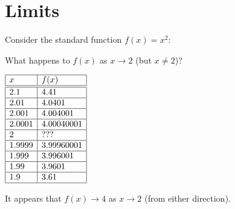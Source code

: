 \documentclass[letterpaper,12pt,fleqn]{article}
\begin{document}
\section*{Limits}

\begin{example}

  Consider the standard function \(f(x)=x^2\):

  \bigskip

  \begin{center}
  \end{center}

  \bigskip

  What happens to \(f(x)\) as \(x\to2\) (but \(x\ne 2\))?

  \bigskip

  \begin{center}
    \(\begin{array}{|l|l|}
    \hline
    x & f(x) \\
    \hline
    \hline
    2.1 & 4.41 \\
    \hline
    2.01 & 4.0401 \\
    \hline
    2.001 & 4.004001 \\
    \hline
    2.0001 & 4.00040001 \\
    \hline
    2 & ??? \\
    \hline
    1.9999 & 3.99960001 \\
    \hline
    1.999 & 3.996001 \\
    \hline
    1.99 & 3.9601 \\
    \hline
    1.9 & 3.61 \\
    \hline
    \end{array}\)
  \end{center}

  \bigskip

  It appears that \(f(x)\to4\) as \(x\to2\) (from either direction).
\end{example}
\end{document}

